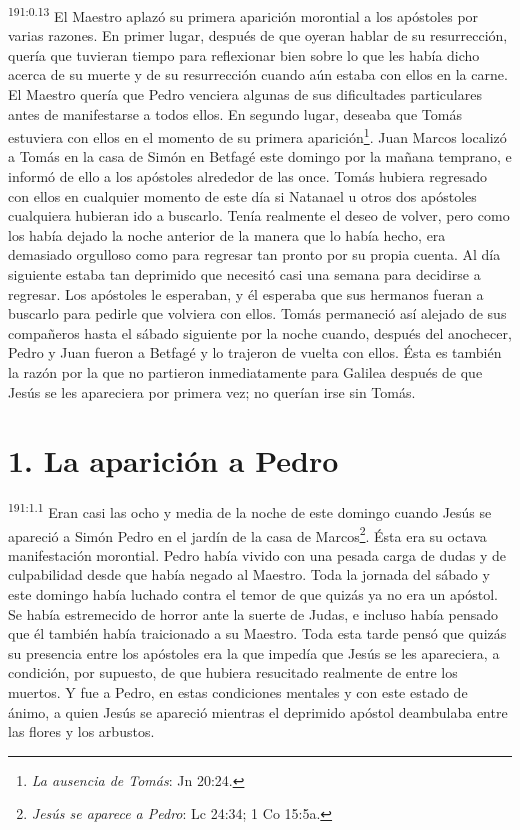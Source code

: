 \par
\textsuperscript{191:0.13} El Maestro aplazó su primera aparición morontial a los apóstoles por varias razones. En primer lugar, después de que oyeran hablar de su resurrección, quería que tuvieran tiempo para reflexionar bien sobre lo que les había dicho acerca de su muerte y de su resurrección cuando aún estaba con ellos en la carne. El Maestro quería que Pedro venciera algunas de sus dificultades particulares antes de manifestarse a todos ellos. En segundo lugar, deseaba que Tomás estuviera con ellos en el momento de su primera aparición\footnote{\textit{La ausencia de Tomás}: Jn 20:24.}. Juan Marcos localizó a Tomás en la casa de Simón en Betfagé este domingo por la mañana temprano, e informó de ello a los apóstoles alrededor de las once. Tomás hubiera regresado con ellos en cualquier momento de este día si Natanael u otros dos apóstoles cualquiera hubieran ido a buscarlo. Tenía realmente el deseo de volver, pero como los había dejado la noche anterior de la manera que lo había hecho, era demasiado orgulloso como para regresar tan pronto por su propia cuenta. Al día siguiente estaba tan deprimido que necesitó casi una semana para decidirse a regresar. Los apóstoles le esperaban, y él esperaba que sus hermanos fueran a buscarlo para pedirle que volviera con ellos. Tomás permaneció así alejado de sus compañeros hasta el sábado siguiente por la noche cuando, después del anochecer, Pedro y Juan fueron a Betfagé y lo trajeron de vuelta con ellos. Ésta es también la razón por la que no partieron inmediatamente para Galilea después de que Jesús se les apareciera por primera vez; no querían irse sin Tomás.

\section*{1. La aparición a Pedro}
\par
\textsuperscript{191:1.1} Eran casi las ocho y media de la noche de este domingo cuando Jesús se apareció a Simón Pedro en el jardín de la casa de Marcos\footnote{\textit{Jesús se aparece a Pedro}: Lc 24:34; 1 Co 15:5a.}. Ésta era su octava manifestación morontial. Pedro había vivido con una pesada carga de dudas y de culpabilidad desde que había negado al Maestro. Toda la jornada del sábado y este domingo había luchado contra el temor de que quizás ya no era un apóstol. Se había estremecido de horror ante la suerte de Judas, e incluso había pensado que él también había traicionado a su Maestro. Toda esta tarde pensó que quizás su presencia entre los apóstoles era la que impedía que Jesús se les apareciera, a condición, por supuesto, de que hubiera resucitado realmente de entre los muertos. Y fue a Pedro, en estas condiciones mentales y con este estado de ánimo, a quien Jesús se apareció mientras el deprimido apóstol deambulaba entre las flores y los arbustos.

